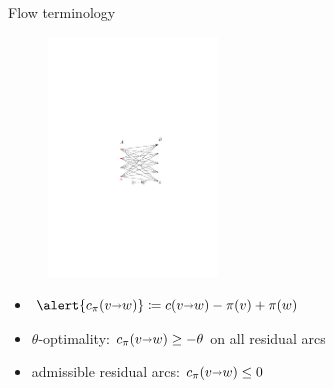 \documentclass[xcolor={dvipsnames,usenames}]{beamer}
\def\arcto{\mathord\shortrightarrow}
\def\arc#1#2{#1\arcto#2}
\begin{document}
\begin{frame}{Flow terminology}
\begin{figure}
\begin{center}
\includegraphics[width=0.4\textwidth,page=8]{pm-to-mcf}%
\end{center}
\end{figure}
\vspace{5pt}
\begin{itemize}
\item $\alert{c_\pi(\arc vw)} \coloneqq c(\arc vw) - \pi(v) + \pi(w)$
\item \alert{$\theta$-optimality}: $c_\pi(\arc vw) \geq -\theta$ on all residual arcs
\item \alert{admissible} residual arcs: $c_\pi(\arc vw) \leq 0$ 
\end{itemize}
\end{frame}

\end{document}
